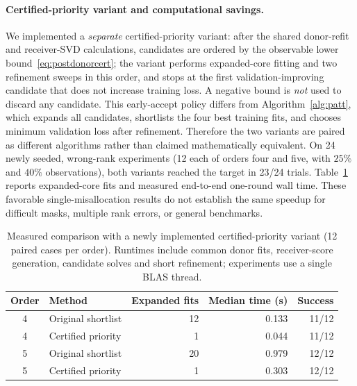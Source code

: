\documentclass[review,10pt]{elsarticle}
\begin{document}
\paragraph{Certified-priority variant and computational savings.}
We implemented a \emph{separate} certified-priority variant: after the shared donor-refit and receiver-SVD calculations, candidates are ordered by the observable lower bound~\eqref{eq:postdonorcert}; the variant performs expanded-core fitting and two refinement sweeps in this order, and stops at the first validation-improving candidate that does not increase training loss. A negative bound is \emph{not} used to discard any candidate. This early-accept policy differs from Algorithm~\ref{alg:patt}, which expands all candidates, shortlists the four best training fits, and chooses minimum validation loss after refinement. Therefore the two variants are paired as different algorithms rather than claimed mathematically equivalent. On 24 newly seeded, wrong-rank experiments (12 each of orders four and five, with $25\%$ and $40\%$ observations), both variants reached the target in 23/24 trials. Table~\ref{tab:priority} reports expanded-core fits and measured end-to-end one-round wall time. These favorable single-misallocation results do not establish the same speedup for difficult masks, multiple rank errors, or general benchmarks.
\begin{table}[tbp]
\caption{Measured comparison with a newly implemented certified-priority variant (12 paired cases per order). Runtimes include common donor fits, receiver-score generation, candidate solves and short refinement; experiments use a single BLAS thread.}\label{tab:priority}
\centering\small
\begin{tabular}{clrrr}
\toprule
Order & Method & Expanded fits & Median time (s) & Success\\
\midrule
4 & Original shortlist & 12 & 0.133 & 11/12\\
4 & Certified priority & 1 & 0.044 & 11/12\\
5 & Original shortlist & 20 & 0.979 & 12/12\\
5 & Certified priority & 1 & 0.303 & 12/12\\
\bottomrule
\end{tabular}
\end{table}
\end{document}
